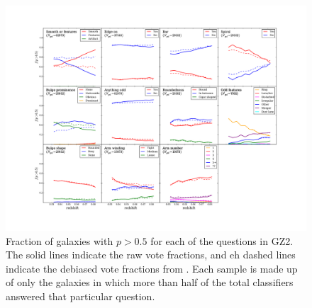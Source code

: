 \documentclass[useAMS,usenatbib]{mn2e}
\begin{document}
\begin{figure}
		\centering
		
        \includegraphics[width=1\textwidth]{Bias_imgs/vote_panel_plot.pdf}
		
        \caption{Fraction of galaxies with $p>0.5$ for each of the questions in GZ2. The solid lines indicate the raw vote fractions, and eh dashed lines indicate the debiased vote fractions from \citep{Willett_13}. Each sample is made up of only the galaxies in which more than half of the total classifiers answered that particular question.}
		
        \label{fig:vote_panel}
        
\end{figure}
\end{document}

